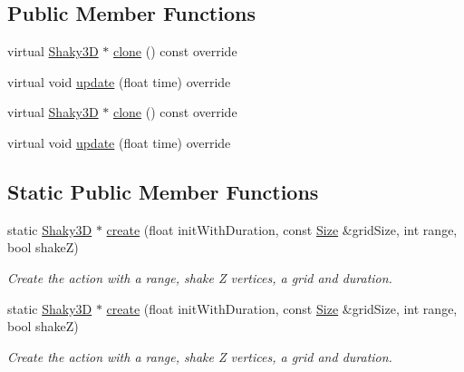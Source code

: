 \subsection*{Public Member Functions}
\begin{DoxyCompactItemize}
\item 
virtual \hyperlink{classShaky3D}{Shaky3D} $\ast$ \hyperlink{classShaky3D_a419f771e52c23750ac4eab5808b76b1b}{clone} () const override
\item 
virtual void \hyperlink{classShaky3D_a5ae962a35331b8d658e078b8a5a578d8}{update} (float time) override
\item 
virtual \hyperlink{classShaky3D}{Shaky3D} $\ast$ \hyperlink{classShaky3D_adaf0dbadf0e32fab853579c4b8df966b}{clone} () const override
\item 
virtual void \hyperlink{classShaky3D_a8842ea9ddb66c7db93595e96d413f603}{update} (float time) override
\end{DoxyCompactItemize}
\subsection*{Static Public Member Functions}
\begin{DoxyCompactItemize}
\item 
static \hyperlink{classShaky3D}{Shaky3D} $\ast$ \hyperlink{classShaky3D_afd614c99e5a400fb1585804561efe471}{create} (float init\+With\+Duration, const \hyperlink{classSize}{Size} \&grid\+Size, int range, bool shakeZ)
\begin{DoxyCompactList}\small\item\em Create the action with a range, shake Z vertices, a grid and duration. \end{DoxyCompactList}\item 
static \hyperlink{classShaky3D}{Shaky3D} $\ast$ \hyperlink{classShaky3D_a3432901e16f6e2857f95bf4dfed40fe5}{create} (float init\+With\+Duration, const \hyperlink{classSize}{Size} \&grid\+Size, int range, bool shakeZ)
\begin{DoxyCompactList}\small\item\em Create the action with a range, shake Z vertices, a grid and duration. \end{DoxyCompactList}\end{DoxyCompactItemize}
